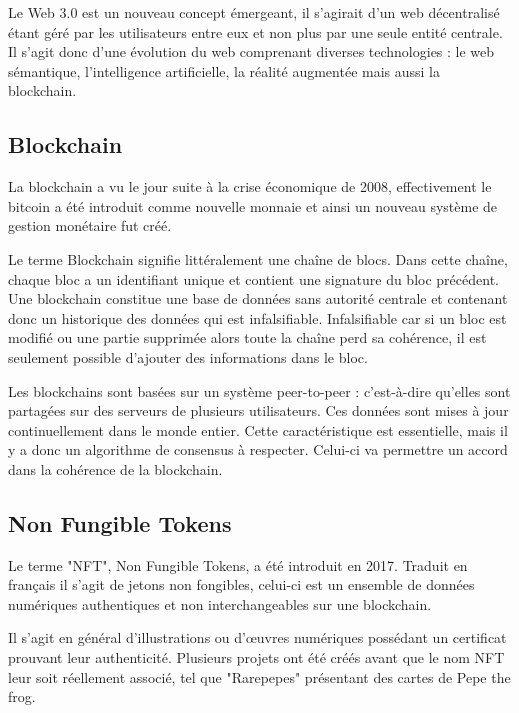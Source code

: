 \documentclass[11pt]{article}
\begin{document}
Le Web 3.0 est un nouveau concept émergeant, il s'agirait d'un web décentralisé étant géré par les utilisateurs entre eux et non plus par une seule entité centrale. Il s'agit donc d'une évolution du web comprenant diverses technologies : le web sémantique, l'intelligence artificielle, la réalité augmentée mais aussi la blockchain. \cite{korpal_decentralization_2022} \cite{rudman_defining_2016}

\subsection{Blockchain} %
La blockchain a vu le jour suite à la crise économique de 2008, effectivement le bitcoin a été introduit comme nouvelle monnaie et ainsi un nouveau système de gestion monétaire fut créé. 

Le terme Blockchain signifie littéralement une chaîne de blocs. Dans cette chaîne, chaque bloc a un identifiant unique et contient une signature du bloc précédent. Une blockchain constitue une base de données sans autorité centrale et contenant donc un historique des données qui est infalsifiable. 
Infalsifiable car si un bloc est modifié ou une partie supprimée alors toute la chaîne perd sa cohérence, il est seulement possible d'ajouter des informations dans le bloc. \cite{dumas_1_2022} \cite{whitaker_art_2021}

Les blockchains sont basées sur un système peer-to-peer : c'est-à-dire qu'elles sont partagées sur des serveurs de plusieurs utilisateurs. Ces données sont mises à jour continuellement dans le monde entier. Cette caractéristique est essentielle, mais il y a donc un algorithme de consensus à respecter. Celui-ci va permettre un accord dans la cohérence de la blockchain. \cite{abbate_blockchain_2022}

\subsection{Non Fungible Tokens} %
Le terme "NFT", Non Fungible Tokens, a été introduit en 2017. Traduit en français il s'agit de jetons non fongibles, celui-ci est un ensemble de données numériques authentiques et non interchangeables sur une blockchain.  

Il s'agit en général d'illustrations ou d'œuvres  numériques possédant un certificat prouvant leur authenticité. Plusieurs projets ont été créés avant que le nom NFT leur soit réellement associé, tel que "Rarepepes" présentant des cartes de Pepe the frog.  
\end{document}

